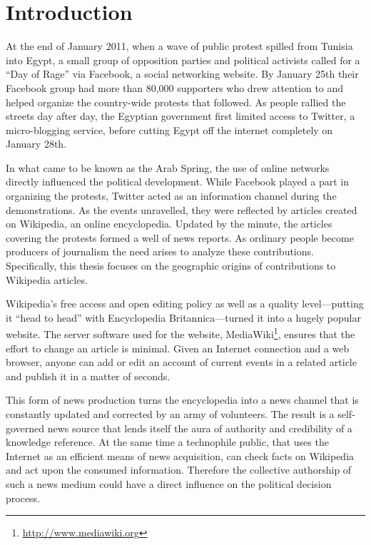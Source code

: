 \chapter{Introduction}\label{ch:introduction}


At the end of January 2011, when a wave of public protest spilled from Tunisia into Egypt, a small group of opposition parties and political activists called for a ``Day of Rage'' via Facebook, a social networking website.
By January 25th their Facebook group had more than 80,000 supporters who drew attention to and helped organize the country-wide protests that followed. 
As people rallied the streets day after day, the Egyptian government first limited access to Twitter, a micro-blogging service, before cutting Egypt off the internet completely on January 28th.\cite{econ18013760, szegypt}

In what came to be known as the Arab Spring, the use of online networks directly influenced the political development.
While Facebook played a part in organizing the protests, Twitter acted as an information channel during the demonstrations.
As the events unravelled, they were reflected by articles created on Wikipedia, an online encyclopedia.
Updated by the minute, the articles covering the protests formed a well of news reports.\cite{wikiegypt}
As ordinary people become producers of journalism the need arises to analyze these contributions. 
Specifically, this thesis focuses on the geographic origins of contributions to Wikipedia articles.

Wikipedia's free access and open editing policy as well as a quality level---putting it ``head to head''\cite{giles2005internet} with Encyclopedia Britannica---turned it into a hugely popular website\cite{wikipv}.
The server software used for the website, MediaWiki\footnote{\url{http://www.mediawiki.org}}, ensures that the effort to change an article is minimal.
Given an Internet connection and a web browser, anyone can add or edit an account of current events in a related article and publish it in a matter of seconds.

This form of news production turns the encyclopedia into a news channel that is constantly updated and corrected by an army of volunteers.
The result is a self-governed news source that lends itself the aura of authority and credibility of a knowledge reference.
At the same time a technophile public, that uses the Internet as an efficient means of news acquisition, can check facts on Wikipedia and act upon the consumed information.\cite[p. 424--427]{chadwick2009routledge}
Therefore the collective authorship of such a news medium could have a direct influence on the political decision process.

